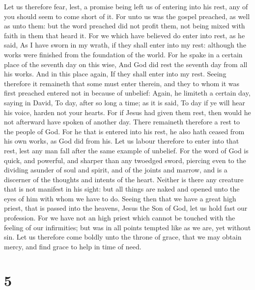  Let us therefore fear, lest, a promise being left us of
entering into his rest, any of you should seem to come short of it.
 For unto us was the gospel preached, as well as unto them:
but the word preached did not profit them, not being mixed with faith in
them that heard it.  For we which have believed do enter
into rest, as he said, As I have sworn in my wrath, if they shall enter
into my rest: although the works were finished from the foundation of
the world.  For he spake in a certain place of the seventh
day on this wise, And God did rest the seventh day from all his works.
 And in this place again, If they shall enter into my rest.
 Seeing therefore it remaineth that some must enter therein,
and they to whom it was first preached entered not in because of
unbelief:  Again, he limiteth a certain day, saying in
David, To day, after so long a time; as it is said, To day if ye will
hear his voice, harden not your hearts.  For if Jesus had
given them rest, then would he not afterward have spoken of another day.
 There remaineth therefore a rest to the people of God.
 For he that is entered into his rest, he also hath ceased
from his own works, as God did from his.  Let us labour
therefore to enter into that rest, lest any man fall after the same
example of unbelief.  For the word of God is quick, and
powerful, and sharper than any twoedged sword, piercing even to the
dividing asunder of soul and spirit, and of the joints and marrow, and
is a discerner of the thoughts and intents of the heart. 
Neither is there any creature that is not manifest in his sight: but all
things are naked and opened unto the eyes of him with whom we have to
do.  Seeing then that we have a great high priest, that is
passed into the heavens, Jesus the Son of God, let us hold fast our
profession.  For we have not an high priest which cannot be
touched with the feeling of our infirmities; but was in all points
tempted like as we are, yet without sin.  Let us therefore
come boldly unto the throne of grace, that we may obtain mercy, and find
grace to help in time of need.

\hypertarget{section-4}{%
\section{5}\label{section-4}}

